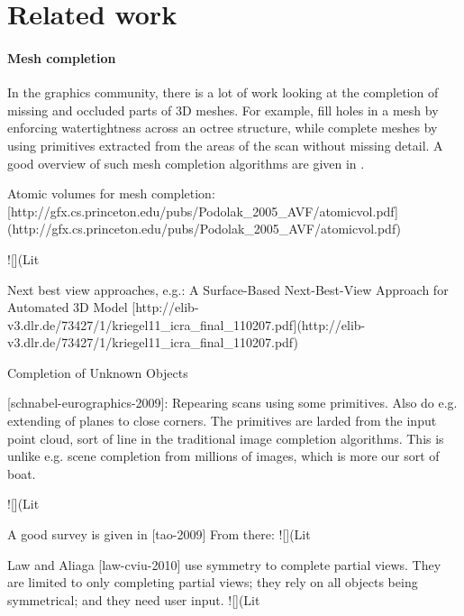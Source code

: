 \documentclass[10pt,a4paper]{article}
\begin{document}
\section{Related work}


\paragraph{Mesh completion}
In the graphics community, there is a lot of work looking at the completion of missing and occluded parts of 3D meshes. 
For example, \cite{podolak-esgp-2005} fill holes in a mesh by enforcing watertightness across an octree structure, while \cite{schnabel-eurographics-2009} complete meshes by using primitives extracted from the areas of the scan without missing detail. 
A good overview of such mesh completion algorithms are given in \cite{ju-cst-2009}.



Atomic volumes for mesh completion:
[http://gfx.cs.princeton.edu/pubs/Podolak_2005_AVF/atomicvol.pdf](http://gfx.cs.princeton.edu/pubs/Podolak_2005_AVF/atomicvol.pdf)

![](Lit%

Next best view approaches, e.g.:
A Surface-Based Next-Best-View Approach for Automated 3D Model
[http://elib-v3.dlr.de/73427/1/kriegel11_icra_final_110207.pdf](http://elib-v3.dlr.de/73427/1/kriegel11_icra_final_110207.pdf)

Completion of Unknown Objects

[schnabel-eurographics-2009]: Repearing scans using some primitives. Also do e.g. extending of planes to close corners. The primitives are larded from the input point cloud, sort of line in the traditional image completion algorithms. This is unlike e.g. scene completion from millions of images, which is more our sort of boat.

![](Lit%

A good survey is given in [tao-2009]
From there:
![](Lit%

Law and Aliaga [law-cviu-2010] use symmetry to complete partial views. They are limited to only completing partial views; they rely on all objects being symmetrical; and they need user input.
![](Lit%
\end{document}
